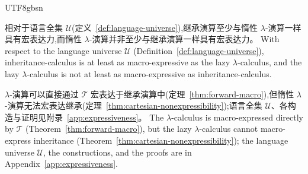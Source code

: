 \begin{CJK*}{UTF8}{gbsn}
\begin{theorem}
  \label{thm:expressive-asymmetry}
  \ifPaperChinese
  相对于语言全集 $\mathscr{U}$(定义~\ref{def:language-universe}),继承演算至少与惰性 $\lambda$-演算一样具有宏表达力,而惰性 $\lambda$-演算并非至少与继承演算一样具有宏表达力。
  \else
  With respect to the language universe $\mathscr{U}$
  (Definition~\ref{def:language-universe}),
  inheritance-calculus is at least as macro-expressive as
  the lazy $\lambda$-calculus, and the lazy
  $\lambda$-calculus is not at least as macro-expressive
  as inheritance-calculus.
  \fi
\end{theorem}

\ifPaperChinese
$\lambda$-演算可以直接通过 $\mathcal{T}$ 宏表达于继承演算中(定理~\ref{thm:forward-macro}),但惰性 $\lambda$-演算无法宏表达继承(定理~\ref{thm:cartesian-nonexpressibility});语言全集 $\mathscr{U}$、各构造与证明见附录~\ref{app:expressiveness}。
\else
The $\lambda$-calculus is macro-expressed directly by $\mathcal{T}$ (Theorem~\ref{thm:forward-macro}),
but the lazy $\lambda$-calculus cannot macro-express inheritance
(Theorem~\ref{thm:cartesian-nonexpressibility}); the language universe $\mathscr{U}$, the constructions,
and the proofs are in Appendix~\ref{app:expressiveness}.
\fi

\section{}
\label{sec:modularity}


\end{CJK*}
